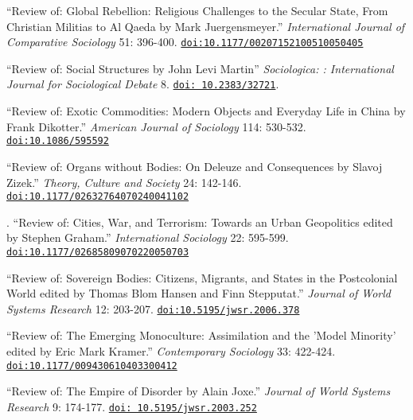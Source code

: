 
\ind ``Review of: Global Rebellion: Religious Challenges to the Secular State, From Christian Militias to Al Qaeda by Mark Juergensmeyer.'' {\em International Journal of Comparative Sociology} 51: 396-400. \href{https://doi.org/10.1177/00207152100510050405
}{\nolinkurl{doi:10.1177/00207152100510050405}}

\ind ``Review of: Social Structures by John Levi Martin'' {\em Sociologica: : International Journal for Sociological Debate} 8. \href{http://www.rivisteweb.it/doi/10.2383/32721}{\nolinkurl{doi: 10.2383/32721}}.

\ind ``Review of: Exotic Commodities: Modern Objects and Everyday Life in China by Frank Dikotter.'' {\em American Journal of Sociology} 114: 530-532. \href{https://doi.org/10.1086/595592}{\nolinkurl{doi:10.1086/595592}}

\ind ``Review of: Organs without Bodies: On Deleuze and Consequences by Slavoj Zizek.'' {\em Theory, Culture and Society} 24:  142-146.  \href{https://doi.org/10.1177/02632764070240041102}{\nolinkurl{doi:10.1177/02632764070240041102}}

. ``Review of: Cities, War, and Terrorism: Towards an Urban Geopolitics edited by Stephen Graham.'' {\em International Sociology} 22:  595-599.  \href{https://doi.org/10.1177/02685809070220050703}{\nolinkurl{doi:10.1177/02685809070220050703}}

\ind ``Review of: Sovereign Bodies: Citizens, Migrants, and States in the Postcolonial World edited by Thomas Blom Hansen and Finn Stepputat.'' {\em Journal of World Systems Research} 12:  203-207. \href{https://doi.org/10.5195/jwsr.2006.378}{\nolinkurl{doi:10.5195/jwsr.2006.378}}

\ind ``Review of: The Emerging Monoculture: Assimilation and the 'Model Minority' edited by Eric Mark Kramer.''  {\em Contemporary Sociology} 33: 422-424. \href{https://doi.org/10.1177/009430610403300412}{\nolinkurl{doi:10.1177/009430610403300412}}

\ind ``Review of: The Empire of Disorder by Alain Joxe.'' {\em Journal of World Systems Research} 9: 174-177. \href{https://doi.org/10.5195/jwsr.2003.252}{\nolinkurl{doi: 10.5195/jwsr.2003.252}}